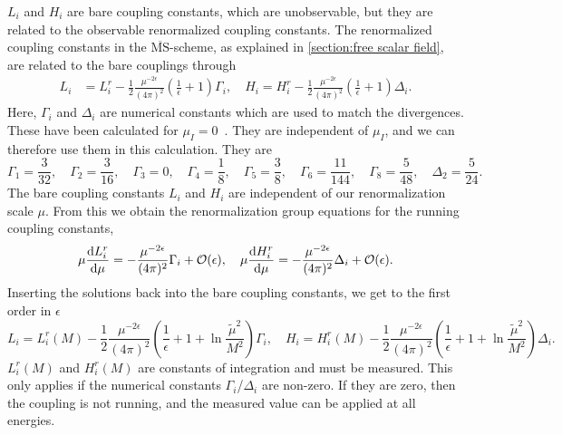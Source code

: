 $L_i$ and $H_i$  are bare coupling constants, which are unobservable, but they are related to the observable renormalized coupling constants.
The renormalized coupling constants in the $\overline{\mathrm{MS}}$-scheme, as explained in \autoref{section:free scalar field}, are related to the bare couplings through
%
\begin{align}
    L_i 
    & = 
    L_i^r 
    -
    \frac{1}{2} \frac{\mu^{-2\epsilon}} {(4 \pi)^2}
    \left(\frac{1}{\epsilon} + 1 \right) \Gamma_i, \quad
    H_i = 
    H_i^r
    -  \frac{1}{2}  \frac{\mu^{-2\epsilon}}{(4 \pi)^2} 
    \left(\frac{1}{\epsilon} + 1 \right) \Delta_i .
\end{align}
%
Here, $\Gamma_i$ and $\Delta_i$ are numerical constants which are used to match the divergences.
These have been calculated for $\mu_I = 0$~\autocite{gasserChiralPerturbationTheory1985}.
They are independent of $\mu_I$, and we can therefore use them in this calculation.
They are
\begin{equation}
    \Gamma_1 = \frac{3}{32}, \quad
    \Gamma_2 = \frac{3}{16}, \quad
    \Gamma_3 = 0, \quad
    \Gamma_4 = \frac{1}{8}, \quad
    \Gamma_5 = \frac{3}{8}, \quad
    \Gamma_6 = \frac{11}{144}, \quad
    \Gamma_8 = \frac{5}{48}, \quad
    \Delta_2 = \frac{5}{24}.
\end{equation}
%
The bare coupling constants $L_i$ and $H_i$ are independent of our renormalization scale $\mu$.
From this we obtain the renormalization group equations for the running coupling constants,
\begin{equation}
    \mu \diff{L_i^r}{\mu } 
    = - \frac{  \mu^{-2\epsilon} }{(4 \pi)^2} \Gamma_i + \mathcal{O}(\epsilon), \quad
    \mu \diff{H_i^r}{\mu } 
    = - \frac{ \mu^{-2\epsilon}}{(4 \pi)^2} \Delta_i + \mathcal{O}(\epsilon).
\end{equation}
%
Inserting the solutions back into the bare coupling constants, we get to the first order in $\epsilon$
%
\begin{equation}
    L_i
    = 
    L_i^r(M)
    - \frac{1}{2} \frac{\mu^{-2\epsilon}} {(4 \pi)^2}
    \left(\frac{1}{\epsilon} + 1 + \ln{\frac{\tilde \mu^2}{M^2}}\right) \Gamma_i,
    \quad
    H_i
    = 
    H_i^r (M)
    - \frac{1}{2} \frac{\mu^{-2\epsilon}} {(4 \pi)^2}
    \left(\frac{1}{\epsilon} + 1 + \ln{\frac{\tilde \mu^2}{M^2}}\right) \Delta_i.
\end{equation}
%
$L_i^r(M)$ and $H_i^r(M)$ are constants of integration and must be measured.
This only applies if the numerical constants $\Gamma_i$/$\Delta_i$ are non-zero.
If they are zero, then the coupling is not running, and the measured value can be applied at all energies.
